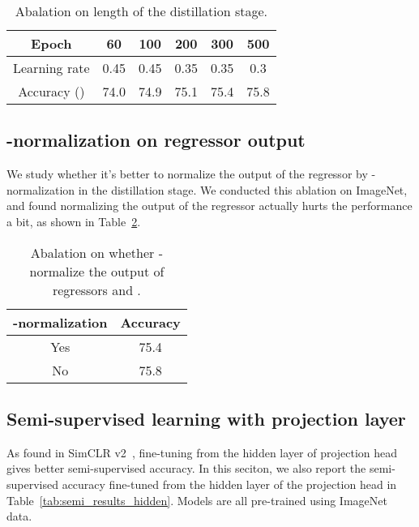 \documentclass[final]{cvpr}
\begin{document}
\begin{table}[h]
\caption{Abalation on length of the distillation stage.}
\label{tab:distill}
\begin{center}
\begin{small}
\begin{tabular}{c|ccccc}
\toprule
Epoch & 60  & 100 & 200 & 300 & 500 \\
\midrule
Learning rate & 0.45 & 0.45 & 0.35 & 0.35 & 0.3 \\
Accuracy () & 74.0 & 74.9 & 75.1 & 75.4 & 75.8 \\
\bottomrule
\end{tabular}
\end{small}
\end{center}
\end{table}

\subsection{-normalization on regressor output}

We study whether it's better to normalize the output of the regressor by -normalization in the distillation stage. We conducted this ablation on ImageNet, and found normalizing the output of the regressor actually hurts the performance a bit, as shown in Table~\ref{tab:normalize}.

\begin{table}[h]
\caption{Abalation on whether -normalize the output of regressors  and .}
\label{tab:normalize}
\begin{center}
\begin{small}
\begin{tabular}{c|c}
\toprule
-normalization & Accuracy \\
\midrule
Yes & 75.4 \\
No  & 75.8 \\
\bottomrule
\end{tabular}
\end{small}
\end{center}
\end{table}

\subsection{Semi-supervised learning with projection layer}
As found in SimCLR v2~\cite{chen2020big}, fine-tuning from the hidden layer of projection head gives better semi-supervised accuracy. In this seciton, we also report the semi-supervised accuracy fine-tuned from the hidden layer of the projection head in Table~\ref{tab:semi_results_hidden}. Models are all pre-trained using ImageNet data.
\end{document}
